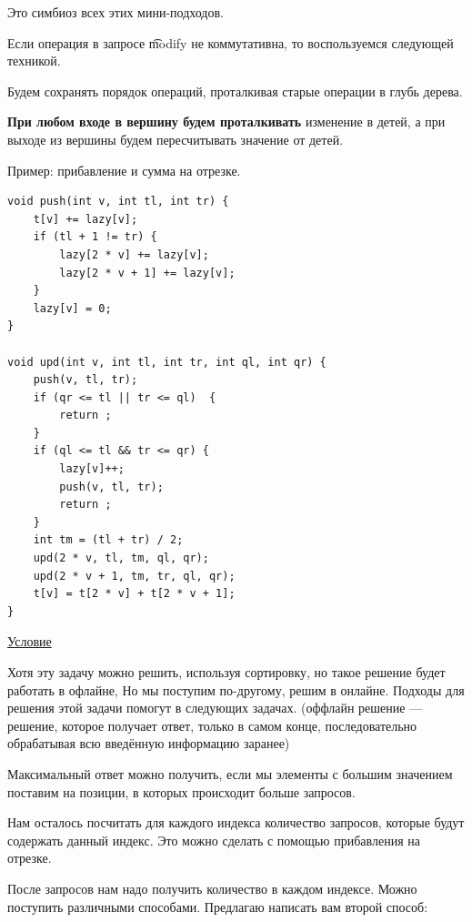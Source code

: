\pagebreak


Это симбиоз всех этих мини-подходов.

Если операция в запросе \t{modify} не коммутативна, то воспользуемся следующей техникой.

Будем сохранять порядок операций, проталкивая старые операции в глубь дерева.

{\bf При любом входе в вершину будем проталкивать} изменение в детей, а при выходе из вершины будем пересчитывать значение от детей.

Пример: прибавление и сумма на отрезке.


\up \up
\begin{verbatim}
void push(int v, int tl, int tr) {
    t[v] += lazy[v];
    if (tl + 1 != tr) {
        lazy[2 * v] += lazy[v];
        lazy[2 * v + 1] += lazy[v];
    }
    lazy[v] = 0;
}

void upd(int v, int tl, int tr, int ql, int qr) {
    push(v, tl, tr);
    if (qr <= tl || tr <= ql)  {
        return ;
    }
    if (ql <= tl && tr <= qr) {
        lazy[v]++;
        push(v, tl, tr);
        return ;
    }
    int tm = (tl + tr) / 2;
    upd(2 * v, tl, tm, ql, qr);
    upd(2 * v + 1, tm, tr, ql, qr);
    t[v] = t[2 * v] + t[2 * v + 1];
}
\end{verbatim}

\pagebreak


\href{https://codeforces.com/contest/276/problem/C}{Условие} \href{https://codeforces.com/contest/276/submission/106207096}{}

Хотя эту задачу можно решить, используя сортировку, но такое решение будет работать в офлайне, Но мы поступим по-другому, решим в онлайне. Подходы для решения этой задачи помогут в следующих задачах. (оффлайн решение --- решение, которое получает ответ, только в самом конце, последовательно обрабатывая всю введённую информацию заранее)

Максимальный ответ можно получить, если мы элементы с большим значением поставим на позиции, в которых происходит больше запросов.

Нам осталось посчитать для каждого индекса количество запросов, которые будут содержать данный индекс. Это можно сделать с помощью прибавления на отрезке.

После запросов нам надо получить количество в каждом индексе. Можно поступить различными способами. Предлагаю написать вам второй способ:

